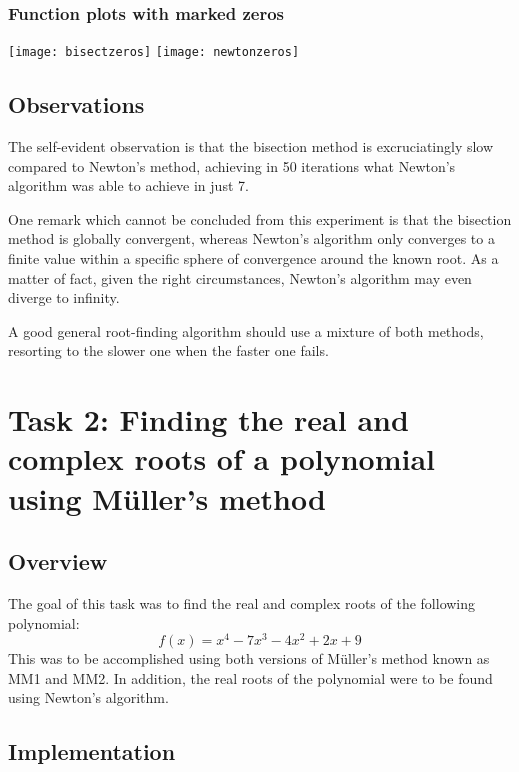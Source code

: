 \documentclass{article}
\begin{document}
	\subsubsection{Function plots with marked zeros}
	
	\texttt{[image: bisectzeros]}
	\texttt{[image: newtonzeros]}
	
	\subsection{Observations}
	
	The self-evident observation is that the bisection method is excruciatingly
	slow compared to Newton's method, achieving in 50 iterations what Newton's
	algorithm was able to achieve in just 7.

	One remark which cannot be concluded from this experiment is that the
	bisection method is globally convergent, whereas Newton's algorithm only
	converges to a finite value within a specific sphere of convergence around
	the known root. As a matter of fact, given the right circumstances, Newton's
	algorithm may even diverge to infinity.
	
	A good general root-finding algorithm should use a mixture of both methods,
	resorting to the slower one when the faster one fails.
	
	\newpage
	
	\section{Task 2: Finding the real and complex roots of a polynomial using
	M{\"u}ller's method}
	
	\subsection{Overview}
	
	The goal of this task was to find the real and complex roots of the
	following polynomial:
	\begin{equation*}
		f(x) = x^4 - 7 x^3 - 4 x^2 + 2 x + 9
	\end{equation*}
	This was to be accomplished using both versions of M{\"u}ller's method
	known as MM1 and MM2. In addition, the real roots of the polynomial were to
	be found using Newton's	algorithm.
	
	\subsection{Implementation}
	
\end{document}

